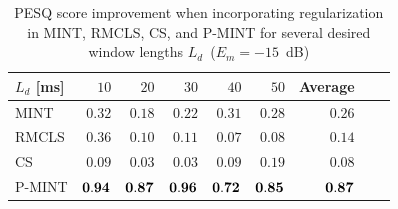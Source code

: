 \documentclass[draftcls,onecolumn,11pt]{IEEEtran}
\begin{document}
\begin{table}[h]
\centering
\caption{PESQ score improvement when incorporating regularization in MINT, RMCLS, CS, and P-MINT for several desired window lengths $L_d$~($E_m = -15$~dB)}
\label{tbl: pesq2}
\begin{tabular}{|l|r|r|r|r|r|r|r|r|}
\hline
$L_d$ [ms] & $10$ & $20$ & $30$ & $40$ & $50$ & Average  \\
\hline
MINT & $0.32$ & $0.18$ & $0.22$ & $0.31$ & $0.28$ & $0.26$ \\
\hline
RMCLS & $0.36$ & $0.10$ & $0.11$ & $0.07$ & $0.08$ & $0.14$ \\
\hline
CS & $0.09$ & $0.03$ & $0.03$ & $0.09$ & $0.19$ & $0.08$ \\
\hline
P-MINT & $\bf{0.94}$ & $\bf{0.87}$ & $\bf{0.96}$ & $\bf{0.72}$ & $\bf{0.85}$ & $\bf{0.87}$ \\
\hline
\end{tabular}
\end{table}
\end{document}
